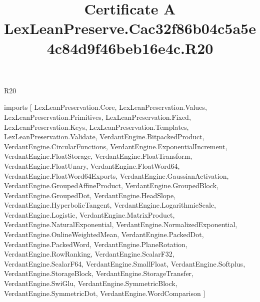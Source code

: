 \begin{lexlean}{R20}
\title{Certificate A LexLeanPreserve.Cac32f86b04c5a5e4c84d9f46beb16e4c.R20}
\begin{coremodule}
imports [
  LexLeanPreservation.Core,
  LexLeanPreservation.Values,
  LexLeanPreservation.Primitives,
  LexLeanPreservation.Fixed,
  LexLeanPreservation.Keys,
  LexLeanPreservation.Templates,
  LexLeanPreservation.Validate,
  VerdantEngine.BitpackedProduct,
  VerdantEngine.CircularFunctions,
  VerdantEngine.ExponentialIncrement,
  VerdantEngine.FloatStorage,
  VerdantEngine.FloatTransform,
  VerdantEngine.FloatUnary,
  VerdantEngine.FloatWord64,
  VerdantEngine.FloatWord64Exports,
  VerdantEngine.GaussianActivation,
  VerdantEngine.GroupedAffineProduct,
  VerdantEngine.GroupedBlock,
  VerdantEngine.GroupedDot,
  VerdantEngine.HeadSlope,
  VerdantEngine.HyperbolicTangent,
  VerdantEngine.LogarithmicScale,
  VerdantEngine.Logistic,
  VerdantEngine.MatrixProduct,
  VerdantEngine.NaturalExponential,
  VerdantEngine.NormalizedExponential,
  VerdantEngine.OnlineWeightedMean,
  VerdantEngine.PackedDot,
  VerdantEngine.PackedWord,
  VerdantEngine.PlaneRotation,
  VerdantEngine.RowRanking,
  VerdantEngine.ScalarF32,
  VerdantEngine.ScalarF64,
  VerdantEngine.SmallFloat,
  VerdantEngine.Softplus,
  VerdantEngine.StorageBlock,
  VerdantEngine.StorageTransfer,
  VerdantEngine.SwiGlu,
  VerdantEngine.SymmetricBlock,
  VerdantEngine.SymmetricDot,
  VerdantEngine.WordComparison
]


\end{coremodule}
\end{lexlean}
